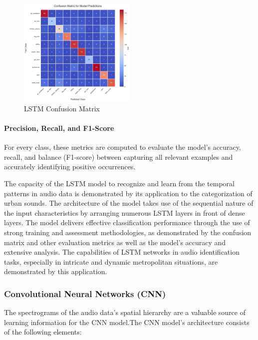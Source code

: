 \documentclass[conference]{IEEEtran}
\begin{document}
\begin{figure}[htbp]
\centerline{\includegraphics[width=0.5\textwidth]{Images/LSTMconfusion.png}}
\caption{LSTM Confusion Matrix}
\label{fig:LSTMconfusion}
\end{figure}

\paragraph{Precision, Recall, and F1-Score}
For every class, these metrics are computed to evaluate the model's accuracy, recall, and balance (F1-score) between capturing all relevant examples and accurately identifying positive occurrences.

The capacity of the LSTM model to recognize and learn from the temporal patterns in audio data is demonstrated by its application to the categorization of urban sounds. The architecture of the model takes use of the sequential nature of the input characteristics by arranging numerous LSTM layers in front of dense layers. The model delivers effective classification performance through the use of strong training and assessment methodologies, as demonstrated by the confusion matrix and other evaluation metrics as well as the model's accuracy and extensive analysis. The capabilities of LSTM networks in audio identification tasks, especially in intricate and dynamic metropolitan situations, are demonstrated by this application.

\subsubsection{Convolutional Neural Networks (CNN)}

The spectrograms of the audio data's spatial hierarchy are a valuable source of learning information for the CNN model.\cite{improve}The CNN model's architecture consists of the following elements:
\end{document}

